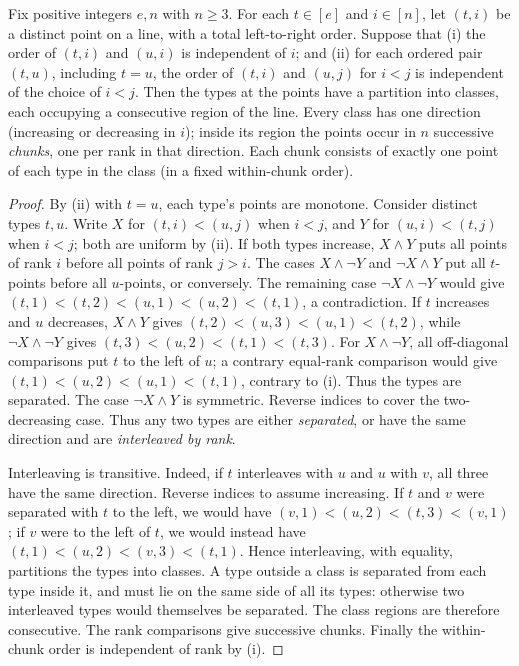 \begin{lemma}
\label{lem:group-block-order}
Fix positive integers $e,n$ with $n\ge3$.  For each
$t\in[e]$ and $i\in[n]$, let $(t,i)$ be a distinct point
on a line, with a total left-to-right order.  Suppose that
(i) the order of $(t,i)$ and $(u,i)$ is independent of $i$;
and (ii) for each ordered pair $(t,u)$, including $t=u$,
the order of $(t,i)$ and $(u,j)$ for $i<j$ is independent
of the choice of $i<j$.
Then the types at the points have a partition into classes,
each occupying a consecutive region of the line.  Every
class has one direction (increasing or decreasing in $i$);
inside its region the points occur in $n$ successive
\emph{chunks}, one per rank in that direction.  Each
chunk consists of exactly one point of each type in the
class (in a fixed within-chunk order).
\end{lemma}
\begin{proof}
By (ii) with $t=u$, each type's points are monotone.
Consider distinct types $t,u$.  Write
$X$ for $(t,i)<(u,j)$ when $i<j$, and $Y$ for
$(u,i)<(t,j)$ when $i<j$; both are uniform by (ii).
If both types increase, $X\wedge Y$ puts all points
of rank $i$ before all points of rank $j>i$.
The cases $X\wedge\neg Y$ and
$\neg X\wedge Y$ put all $t$-points before all
$u$-points, or conversely.  The remaining case
$\neg X\wedge\neg Y$ would give
$(t,1)<(t,2)<(u,1)<(u,2)<(t,1)$,
a contradiction.  If $t$ increases and $u$ decreases, $X\wedge Y$
gives $(t,2)<(u,3)<(u,1)<(t,2)$, while
$\neg X\wedge\neg Y$ gives
$(t,3)<(u,2)<(t,1)<(t,3)$.
For $X\wedge\neg Y$, all off-diagonal comparisons
put $t$ to the left of $u$; a contrary equal-rank
comparison would give
$(t,1)<(u,2)<(u,1)<(t,1)$,
contrary to (i).  Thus the types are separated.
The case $\neg X\wedge Y$ is symmetric.
Reverse indices
to cover the two-decreasing case.  Thus any two
types are either \emph{separated}, or have the
same direction and are \emph{interleaved by rank}.

Interleaving is transitive.  Indeed, if $t$ interleaves
with $u$ and $u$ with $v$, all three have the same
direction.  Reverse indices to assume increasing.
If $t$ and $v$ were separated with $t$ to the left,
we would have
$(v,1)<(u,2)<(t,3)<(v,1)$;
if $v$ were to the left of $t$, we would instead
have $(t,1)<(u,2)<(v,3)<(t,1)$.
Hence interleaving, with equality, partitions
the types into classes.  A type outside a class is
separated from each type inside it, and must lie
on the same side of all its types: otherwise two
interleaved types would themselves be separated.
The class regions are therefore consecutive.  The
rank comparisons give successive chunks.  Finally
the within-chunk order is independent of rank by (i).
\end{proof}

